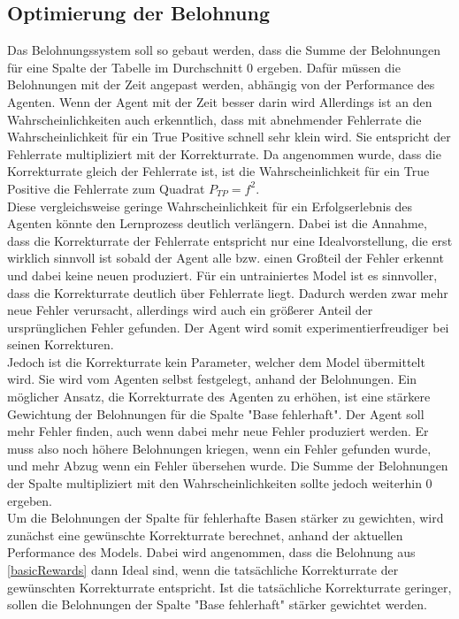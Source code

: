 \documentclass[oneside,bibliography=totocnumbered,BCOR=5mm]{scrbook}%
\theoremstyle{definition}
\theoremstyle{definition}
\theoremstyle{definition}
\theoremstyle{definition}
\theoremstyle{definition}
\theoremstyle{definition}
\begin{document}
\subsection{Optimierung der Belohnung}
Das Belohnungssystem soll so gebaut werden, dass die Summe der Belohnungen für eine Spalte der Tabelle
im Durchschnitt 0 ergeben. Dafür müssen die Belohnungen mit der Zeit angepast werden, abhängig von der
Performance des Agenten. Wenn der Agent mit der Zeit besser darin wird 
Allerdings ist an den Wahrscheinlichkeiten auch erkenntlich, 
dass mit abnehmender Fehlerrate die Wahrscheinlichkeit für ein True Positive schnell sehr klein wird.
Sie entspricht der Fehlerrate multipliziert mit der Korrekturrate.
Da angenommen wurde, dass die Korrekturrate gleich der Fehlerrate ist, ist die Wahrscheinlichkeit
für ein True Positive die Fehlerrate zum Quadrat \(P_{TP} = f^2\). \\

Diese vergleichsweise geringe Wahrscheinlichkeit für ein Erfolgserlebnis des Agenten könnte den Lernprozess deutlich verlängern.
Dabei ist die Annahme, dass die Korrekturrate der Fehlerrate entspricht nur eine Idealvorstellung, die erst wirklich sinnvoll
ist sobald der Agent alle bzw. einen Großteil der Fehler erkennt und dabei keine neuen produziert.
Für ein untrainiertes Model ist es sinnvoller, dass die Korrekturrate deutlich über Fehlerrate liegt. 
Dadurch werden zwar mehr neue Fehler verursacht, allerdings wird auch ein größerer Anteil der ursprünglichen Fehler
gefunden. Der Agent wird somit experimentierfreudiger bei seinen Korrekturen.\\

Jedoch ist die Korrekturrate kein Parameter, welcher dem Model übermittelt wird.
Sie wird vom Agenten selbst festgelegt, anhand der Belohnungen. 
Ein möglicher Ansatz, die Korrekturrate des Agenten zu erhöhen, ist eine stärkere Gewichtung der Belohnungen für die Spalte "Base fehlerhaft".
Der Agent soll mehr Fehler finden, auch wenn dabei mehr neue Fehler produziert werden.
Er muss also noch höhere Belohnungen kriegen, wenn ein Fehler gefunden wurde,
und mehr Abzug wenn ein Fehler übersehen wurde. Die Summe der Belohnungen der Spalte 
multipliziert mit den Wahrscheinlichkeiten sollte jedoch weiterhin 0 ergeben. \\

Um die Belohnungen der Spalte für fehlerhafte Basen stärker zu gewichten, wird zunächst eine
gewünschte Korrekturrate berechnet, anhand der aktuellen Performance des Models.
Dabei wird angenommen, dass die Belohnung aus \ref{basicRewards} dann Ideal sind, 
wenn die tatsächliche Korrekturrate der gewünschten Korrekturrate entspricht.
Ist die tatsächliche Korrekturrate geringer, sollen die Belohnungen der Spalte "Base fehlerhaft"
stärker gewichtet werden. \\
\end{document}
